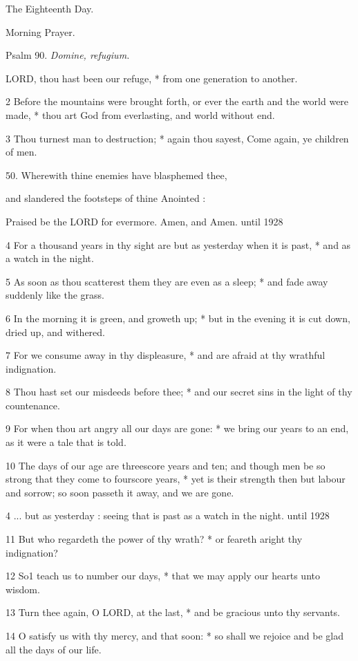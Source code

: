 The
Eighteenth Day.

Morning
Prayer.

Psalm
90. \emph{Domine, refugium.}

LORD,
thou hast been our refuge, * from one generation to another.

2 Before the mountains were brought forth, or ever
the earth and the world were made, * thou art God from everlasting, and
world without end.

3 Thou turnest man to destruction; * again thou sayest,
Come again, ye children of men.

50. Wherewith thine enemies
have blasphemed thee,

and slandered the footsteps of thine Anointed :

Praised be the LORD for evermore. Amen, and Amen.
until
1928

4 For a thousand years in thy sight are but as yesterday when it is past,
* and as a watch in the night.

5 As soon as thou scatterest them they are even as a
sleep; * and fade away suddenly like the grass.

6 In the morning it is green, and groweth up; * but in
the evening it is cut down, dried up, and withered.

7 For we consume away in thy displeasure, * and are afraid
at thy wrathful indignation.

8 Thou hast set our misdeeds before thee; * and our secret
sins in the light of thy countenance.

9 For when thou art angry all our days are gone: * we
bring our years to an end, as it were a tale that is told.

10 The days of our age are threescore years and ten;
and though men be so strong that they come to fourscore years, * yet is
their strength then but labour and sorrow; so soon passeth it away, and
we are gone.

4 ... but as yesterday :
seeing that is past as a watch in the night. until
1928

11 But who regardeth the power of thy wrath? * or feareth aright thy indignation?

12 So1 teach us to number our days, * that
we may apply our hearts unto wisdom.

13 Turn thee again, O LORD, at the last, * and be gracious
unto thy servants.

14 O satisfy us with thy mercy, and that soon: * so
shall we rejoice and be glad all the days of our life.

